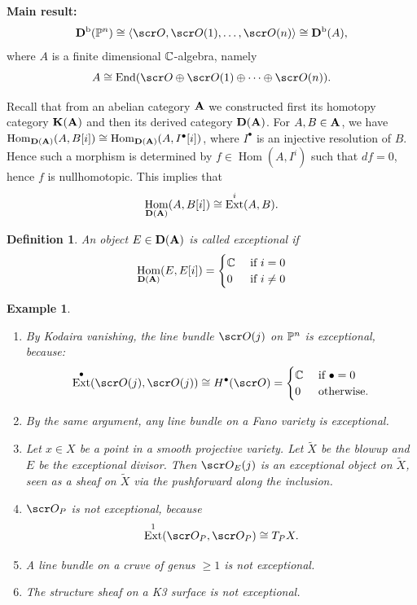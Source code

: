 \documentclass[A4paper, british, reqno]{amsart}
\theoremstyle{darkgreentheorem}
\theoremstyle{darkbluedefinition}
\newtheorem{defn}[thm]{Definition}
\theoremstyle{darkredexample}
\newtheorem{exa}[thm]{Example}
\theoremstyle{remark}
\DeclareMathOperator{\Hom}{Hom}
\DeclareMathOperator{\Ext}{Ext}
\DeclareMathOperator{\End}{End}
\newcommand{\1}{\mathbbm{1}}
\newcommand{\op}{\oplus}
\newcommand{\grd}{^{\bullet}}
\begin{document}
\textbf{Main result:}
\[ \Db(\P^{n}) \cong \langle \O,\O(1),\ldots, \O(n) \rangle \cong \Db(A), \]
where $A$ is a finite dimensional $\C$-algebra, namely
\[ A\cong \End(\O\op \O(1) \op \cdots \op \O(n)). \]

Recall that from an abelian category $\bfA$ we constructed first its homotopy category $\K(\bfA)$ and then its derived category $\D(\bfA)$.
For $A,B\in \bfA$, we have $\Hom_{\D(\bfA)}(A,B[i])\cong \Hom_{\D(\bfA)}(A,I\grd[i])$, where $I\grd$ is an injective resolution of $B$.
Hence such a morphism is determined by $f\in \Hom(A,I^{i})$ such that $df=0$, hence $f$ is nullhomotopic.
This implies that
\[ \Hom_{\D(\bfA)}(A,B[i])\cong \Ext^{i}(A,B). \]

\begin{defn}
    An object $E\in \D(\bfA)$ is called \textit{exceptional} if
    \[ \Hom_{\D(\bfA)}(E,E[i])=\begin{cases}
	\C & \text{ if } i=0 \\
	0 & \text{ if } i\neq 0 
    \end{cases}
    \]
\end{defn}

\begin{exa}
    \begin{enumerate}
	\item By Kodaira vanishing, the line bundle $\O(j)$ on $\P^{n}$ is exceptional, because:
	    \[ \Ext\grd(\O(j),\O(j))\cong H\grd(\O)=\begin{cases}
		\C & \text{ if } \bullet=0 \\
		0 & \text{ otherwise.}
	    \end{cases}
	    \]
	\item By the same argument, any line bundle on a Fano variety is exceptional.
	\item Let $x\in X$ be a point in a smooth projective variety.
	    Let $\tilde{X}$ be the blowup and $E$ be the exceptional divisor.
	    Then $\O_{E}(j)$ is an exceptional object on $\tilde{X}$, seen as a sheaf on $\tilde{X}$ via the pushforward along the inclusion.
	\item $\O_{P}$ is not exceptional, because
	    \[ \Ext^{1}(\O_{P},\O_{P})\cong T_{P}X. \]
	\item A line bundle on a cruve of genus $\geqslant 1$ is not exceptional.
	\item The structure sheaf on a K3 surface is not exceptional.
    \end{enumerate}
\end{exa}
\end{document}
